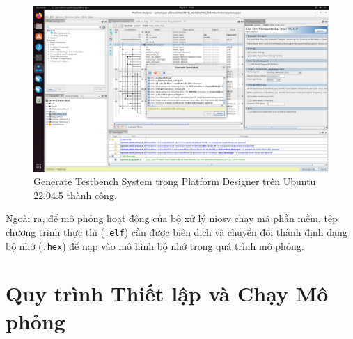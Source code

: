 \begin{figure}[htbp]
    \centering
    \includegraphics[width=\linewidth]{Images/04_01_UbuntuGenerateTestbenchSystem.png}
    \caption{Generate Testbench System trong Platform Designer trên Ubuntu 22.04.5 thành công.}
    \label{fig:04_01_UbuntuGenerateTestbenchSystem}
\end{figure}

Ngoài ra, để mô phỏng hoạt động của bộ xử lý \acrshort{niosv} chạy mã phần mềm, tệp chương trình thực thi (\texttt{.elf}) cần được biên dịch và chuyển đổi thành định dạng bộ nhớ (\texttt{.hex}) để nạp vào mô hình bộ nhớ trong quá trình mô phỏng.

\FloatBarrier

\section{Quy trình Thiết lập và Chạy Mô phỏng}

